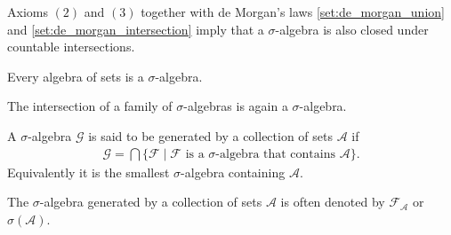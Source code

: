     \begin{remark}
        Axioms $(2)$ and $(3)$ together with de Morgan's laws \eqref{set:de_morgan_union} and \eqref{set:de_morgan_intersection} imply that a $\sigma$-algebra is also closed under countable intersections.
    \end{remark}

    \begin{result}
        Every algebra of sets is a $\sigma$-algebra.
    \end{result}

    \begin{property}[Intersections]
        The intersection of a family of $\sigma$-algebras is again a $\sigma$-algebra.
    \end{property}

    \begin{definition}
        A $\sigma$-algebra $\mathcal{G}$ is said to be generated by a collection of sets $\mathcal{A}$ if
        \begin{gather}
            \label{set:generated_sigma_algebra}
            \mathcal{G} = \bigcap\{\mathcal{F}\mid\mathcal{F}\text{ is a } \sigma\text{-algebra that contains }\mathcal{A}\}.
        \end{gather}
        Equivalently it is the smallest $\sigma$-algebra containing $\mathcal{A}$.
    \end{definition}
    \begin{notation}\label{set:notation:generated_sigma_algebra}
        The $\sigma$-algebra generated by a collection of sets $\mathcal{A}$ is often denoted by $\mathcal{F}_\mathcal{A}$ or $\sigma(\mathcal{A})$.
    \end{notation}

